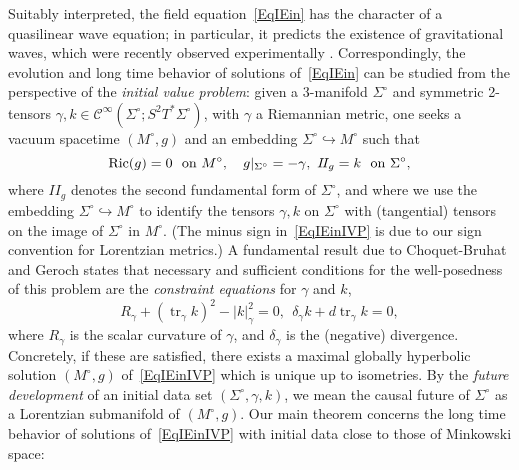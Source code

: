 \documentclass[reqno,11pt,letterpaper]{amsart}
\numberwithin{equation}{section}
\numberwithin{figure}{section}
\theoremstyle{definition}
\theoremstyle{remark}
\newcommand{\mc}{\mathcal}
\newcommand{\cC}{\mc C}
\newcommand{\tr}{\operatorname{tr}}
\newcommand{\II}{I\!I}
\newcommand{\hra}{\hookrightarrow}
\newcommand{\tn}{\textnormal}
\newcommand{\CI}{\cC^\infty}
\newcommand{\Ric}{\mathrm{Ric}}
\begin{document}
Suitably interpreted, the field equation~\eqref{EqIEin} has the character of a quasilinear wave equation; in particular, it predicts the existence of gravitational waves, which were recently observed experimentally \cite{LIGOBlackHoleMerger}. Correspondingly, the evolution and long time behavior of solutions of~\eqref{EqIEin} can be studied from the perspective of the \emph{initial value problem}: given a $3$-manifold $\Sigma^\circ$ and symmetric 2-tensors $\gamma,k\in\CI(\Sigma^\circ;S^2 T^*\Sigma^\circ)$, with $\gamma$ a Riemannian metric, one seeks a vacuum spacetime $(M^\circ,g)$ and an embedding $\Sigma^\circ\hra M^\circ$ such that
\begin{equation}
\label{EqIEinIVP}
  \Ric(g) = 0\ \ \tn{on}\ M^\circ,\quad
  g|_{\Sigma^\circ}=-\gamma,\ \II_g=k\ \ \tn{on}\ \Sigma^\circ,
\end{equation}
where $\II_g$ denotes the second fundamental form of $\Sigma^\circ$, and where we use the embedding $\Sigma^\circ\hra M^\circ$ to identify the tensors $\gamma,k$ on $\Sigma^\circ$ with (tangential) tensors on the image of $\Sigma^\circ$ in $M^\circ$. (The minus sign in~\eqref{EqIEinIVP} is due to our sign convention for Lorentzian metrics.) A fundamental result due to Choquet-Bruhat and Geroch \cite{ChoquetBruhatLocalEinstein,ChoquetBruhatGerochMGHD} states that necessary and sufficient conditions for the well-posedness of this problem are the \emph{constraint equations} for $\gamma$ and $k$,
\begin{equation}
\label{EqIConstraints}
  R_\gamma+(\tr_\gamma k)^2-|k|_\gamma^2 = 0,\ \ 
  \delta_\gamma k+d\tr_\gamma k=0,
\end{equation}
where $R_\gamma$ is the scalar curvature of $\gamma$, and $\delta_\gamma$ is the (negative) divergence. Concretely, if these are satisfied, there exists a maximal globally hyperbolic solution $(M^\circ,g)$ of~\eqref{EqIEinIVP} which is unique up to isometries. By the \emph{future development} of an initial data set $(\Sigma^\circ,\gamma,k)$, we mean the causal future of $\Sigma^\circ$ as a Lorentzian submanifold of $(M^\circ,g)$. Our main theorem concerns the long time behavior of solutions of~\eqref{EqIEinIVP} with initial data close to those of Minkowski space:
\end{document}

